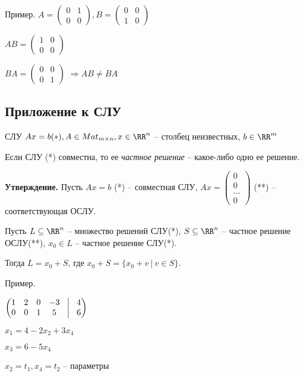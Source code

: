Пример.
$A = \begin{pmatrix} 0 & 1 \\ 0 & 0 \end{pmatrix}, B = \begin{pmatrix} 0 & 0 \\ 1 & 0 \end{pmatrix}$

$AB = \begin{pmatrix} 1 & 0 \\ 0 & 0 \end{pmatrix}$

$BA = \begin{pmatrix} 0 & 0 \\ 0 & 1 \end{pmatrix}$
$\Rightarrow AB \neq BA$

\bigskip
\subsection{Приложение к СЛУ}

СЛУ $Ax = b (*), A \in Mat_{m \times n}, x \in \RR^n$ -- столбец неизвестных, $b \in \RR^m$

\bigskip
Если СЛУ (*) совместна, то ее \textit{частное решение} -- какое-либо одно ее решение.

\bigskip
\textbf{Утверждение.} Пусть $Ax = b$ (*) -- совместная СЛУ, $Ax = \begin{pmatrix} 0 \\ 0 \\ \dots \\ 0 \end{pmatrix}$ (**) -- соответствующая ОСЛУ.

Пусть $L \subseteq  \RR^n$ -- множество решений СЛУ(*), $S \subseteq \RR^n$ -- частное решение ОСЛУ(**), $x_0 \in L$ -- частное решение СЛУ(*).

Тогда $L = x_0 + S$, где $x_0 + S = \{ x_0 + v \ | \ v \in S \}$.

\bigskip
Пример.

\bigskip
$\begin{pmatrix} 1 & 2 & 0 & -3 & \vline & 4 \\ 0 & 0 & 1 & 5 & \vline & 6 \end{pmatrix}$

\bigskip
$x_1 = 4 - 2x_2 + 3x_4$

$x_3 = 6 - 5x_4$

$x_2 = t_1, x_4 = t_2$ -- параметры

